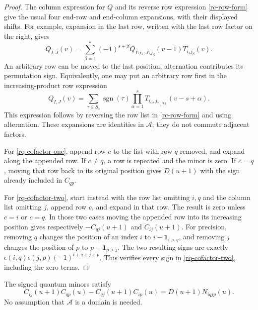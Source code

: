 \begin{proof}
The column expression for $Q$ and its reverse row
expression \eqref{rc-row-form} give the usual four
end-row and end-column expansions, with their displayed
shifts.  For example, expansion in the last row, written
with the last row factor on the right, gives
\[
 Q_{I,J}(v)=
 \sum_{\beta=1}^{s}(-1)^{s+\beta}
 Q_{I\setminus i_s,J\setminus j_\beta}(v-1)
 T_{i_sj_\beta}(v).
\]
An arbitrary row can be moved to the last position;
alternation contributes its permutation sign.
Equivalently, one may put an arbitrary row first in the
increasing-product row expression
\[
 Q_{I,J}(v)=
 \sum_{\tau\in S_s}\operatorname{sgn}(\tau)
 \prod_{\alpha=1}^{s}
 T_{i_\alpha,j_{\tau(\alpha)}}(v-s+\alpha).
\]
This expression follows by reversing the row list in
\eqref{rc-row-form} and using alternation.
These expansions are identities in $\mathcal A$;
they do not commute adjacent factors.

For \eqref{rq-cofactor-one}, append row $c$ to the list
with row $q$ removed, and expand along the appended row.
If $c\ne q$, a row is repeated and the minor is zero.
If $c=q$, moving that row back to its original position
gives $D(u+1)$ with the sign already included in
$C_{qp}$.

For \eqref{rq-cofactor-two}, start instead with the row
list omitting $i,q$ and the column list omitting $j$,
append row $c$, and expand in that row.
The result is zero unless $c=i$ or $c=q$.
In those two cases moving the appended row into its
increasing position gives respectively
$-C_{qj}(u+1)$ and $C_{ij}(u+1)$.
For precision, removing $q$ changes the position of
an index $i$ to $i-\mathbf1_{i>q}$, and removing $j$
changes the position of $p$ to $p-\mathbf1_{p>j}$.
The two resulting signs are exactly
$\epsilon(i,q)\epsilon(j,p)(-1)^{i+q+j+p}$.
This verifies every sign in
\eqref{rq-cofactor-two}, including the zero terms.
\end{proof}

\begin{theorem}\label{rq-jacobi}
The signed quantum minors satisfy
\begin{equation}\label{rq-jacobi-identity}
 C_{ij}(u+1)C_{qp}(u)-C_{qj}(u+1)C_{ip}(u)
                  =D(u+1)N_{iqjp}(u).
\end{equation}
No assumption that $\mathcal A$ is a domain is needed.
\end{theorem}

